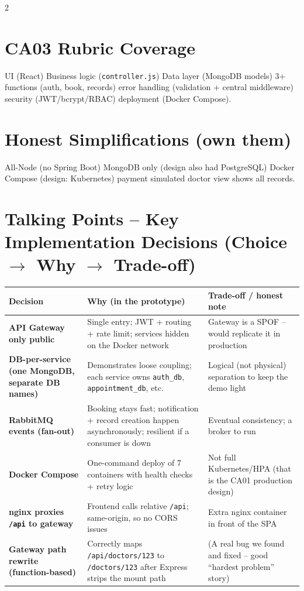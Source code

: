 \documentclass[10pt,a4paper]{article}
\newcommand{\code}[1]{\texttt{\footnotesize #1}}
\begin{document}
\begin{multicols}{2}
\section{CA03 Rubric Coverage}
{\footnotesize UI (React) \textbullet{} Business logic (\code{controller.js}) \textbullet{}
Data layer (MongoDB models) \textbullet{} 3+ functions (auth, book, records) \textbullet{}
error handling (validation + central middleware) \textbullet{} security (JWT/bcrypt/RBAC)
\textbullet{} deployment (Docker Compose).}

\section{Honest Simplifications (own them)}
{\footnotesize All-Node (no Spring Boot) \textbullet{} MongoDB only (design also had PostgreSQL)
\textbullet{} Docker Compose (design: Kubernetes) \textbullet{} payment simulated \textbullet{}
doctor view shows all records.}

\end{multicols}

\vspace{1pt}
\section{Talking Points -- Key Implementation Decisions (Choice $\rightarrow$ Why $\rightarrow$ Trade-off)}
\vspace{1pt}
{\scriptsize
\begin{tabular}{@{}>{\bfseries}p{2.7cm} p{6.4cm} p{6.6cm}@{}}
\toprule
\textbf{Decision} & \textbf{Why (in the prototype)} & \textbf{Trade-off / honest note}\\
\midrule
API Gateway only public & Single entry; JWT + routing + rate limit; services hidden on the
Docker network & Gateway is a SPOF -- would replicate it in production\\
DB-per-service (one MongoDB, separate DB names) & Demonstrates loose coupling; each service owns
\code{auth\_db}, \code{appointment\_db}, etc. & Logical (not physical) separation to keep the demo
light\\
RabbitMQ events (fan-out) & Booking stays fast; notification + record creation happen
asynchronously; resilient if a consumer is down & Eventual consistency; a broker to run\\
Docker Compose & One-command deploy of 7 containers with health checks + retry logic &
Not full Kubernetes/HPA (that is the CA01 production design)\\
nginx proxies \code{/api} to gateway & Frontend calls relative \code{/api}; same-origin, so no
CORS issues & Extra nginx container in front of the SPA\\
Gateway path rewrite (function-based) & Correctly maps \code{/api/doctors/123} to
\code{/doctors/123} after Express strips the mount path & (A real bug we found and fixed -- good
``hardest problem'' story)\\
\bottomrule
\end{tabular}}
\end{document}
